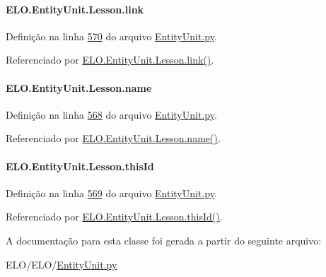 \paragraph[{link}]{\setlength{\rightskip}{0pt plus 5cm}E\+L\+O.\+Entity\+Unit.\+Lesson.\+link}\label{classELO_1_1EntityUnit_1_1Lesson_a5288d46b77e4b0cfd382857ef1b82fba}


Definição na linha \hyperlink{EntityUnit_8py_source_l00570}{570} do arquivo \hyperlink{EntityUnit_8py_source}{Entity\+Unit.\+py}.



Referenciado por \hyperlink{classELO_1_1EntityUnit_1_1Lesson_ae7a457f64a02c5d98fe7255838e942de}{E\+L\+O.\+Entity\+Unit.\+Lesson.\+link()}.

\hypertarget{classELO_1_1EntityUnit_1_1Lesson_a1ca164978817a007dbec8193caae96ff}{}
\paragraph[{name}]{\setlength{\rightskip}{0pt plus 5cm}E\+L\+O.\+Entity\+Unit.\+Lesson.\+name}\label{classELO_1_1EntityUnit_1_1Lesson_a1ca164978817a007dbec8193caae96ff}


Definição na linha \hyperlink{EntityUnit_8py_source_l00568}{568} do arquivo \hyperlink{EntityUnit_8py_source}{Entity\+Unit.\+py}.



Referenciado por \hyperlink{classELO_1_1EntityUnit_1_1Lesson_ae95f28f1a9cd640fa184ee4c8fefe528}{E\+L\+O.\+Entity\+Unit.\+Lesson.\+name()}.

\hypertarget{classELO_1_1EntityUnit_1_1Lesson_a2ec9bd43b6b7ac7c7d00469c9f586271}{}
\paragraph[{this\+Id}]{\setlength{\rightskip}{0pt plus 5cm}E\+L\+O.\+Entity\+Unit.\+Lesson.\+this\+Id}\label{classELO_1_1EntityUnit_1_1Lesson_a2ec9bd43b6b7ac7c7d00469c9f586271}


Definição na linha \hyperlink{EntityUnit_8py_source_l00569}{569} do arquivo \hyperlink{EntityUnit_8py_source}{Entity\+Unit.\+py}.



Referenciado por \hyperlink{classELO_1_1EntityUnit_1_1Lesson_ad2584991f58cc65ff912aa2f4a4157c9}{E\+L\+O.\+Entity\+Unit.\+Lesson.\+this\+Id()}.



A documentação para esta classe foi gerada a partir do seguinte arquivo\+:\begin{DoxyCompactItemize}
\item 
E\+L\+O/\+E\+L\+O/\hyperlink{EntityUnit_8py}{Entity\+Unit.\+py}\end{DoxyCompactItemize}
